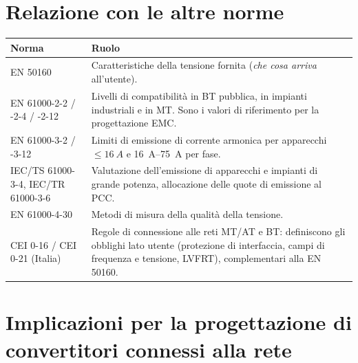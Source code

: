 \section{Relazione con le altre norme}

\begin{table}[h]
\centering
\small
\begin{tabular}{p{}p{}}
\toprule
\textbf{Norma} & \textbf{Ruolo} \\
\midrule
EN 50160 & Caratteristiche della tensione fornita (\emph{che cosa arriva} all'utente). \\
EN 61000-2-2 / -2-4 / -2-12 & Livelli di compatibilità in BT pubblica, in impianti
industriali e in MT. Sono i valori di riferimento per la progettazione EMC. \\
EN 61000-3-2 / -3-12 & Limiti di emissione di corrente armonica per apparecchi
$\le \SI{16}{A}$ e \SIrange{16}{75}{A} per fase. \\
IEC/TS 61000-3-4, IEC/TR 61000-3-6 & Valutazione dell'emissione di apparecchi e
impianti di grande potenza, allocazione delle quote di emissione al PCC. \\
EN 61000-4-30 & Metodi di misura della qualità della tensione. \\
CEI 0-16 / CEI 0-21 (Italia) & Regole di connessione alle reti MT/AT e BT: definiscono
gli obblighi lato utente (protezione di interfaccia, campi di frequenza e tensione,
LVFRT), complementari alla EN 50160. \\
\bottomrule
\end{tabular}
\end{table}

\section{Implicazioni per la progettazione di convertitori connessi alla rete}

